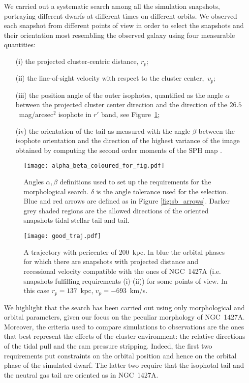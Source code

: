 We carried out a systematic search among all the simulation snapshots, portraying different dwarfs at different times on different orbits.
We observed each snapshot from different points of view in order to select the snapshots and their orientation most resembling the observed galaxy using four measurable quantities:
\begin{enumerate}
    \item[(i)] the projected cluster-centric distance, $r_p$;
    \item[(ii)] the line-of-sight velocity with respect to the cluster center,~$v_p$;
    \item[(iii)] the position angle of the outer isophotes, quantified as the angle $\alpha$ between the projected cluster center direction and the direction of the $26.5$~mag/arcsec$^2$ isophote in $r'$ band, see Figure~\ref{fig:angles_scheme};
    \item[(iv)] the orientation of the \Hi{} tail as measured with the angle $\beta$ between the isophote orientation and the direction of the highest variance of the image obtained by computing the second order moments of the \Hi{} SPH map \citep{Stobie1980}.
\end{enumerate}
\begin{figure}
\centering
\texttt{[image: alpha\_beta\_coloured\_for\_fig.pdf]}
\caption{Angles $\alpha, \beta$ definitions used to set up the  requirements for the morphological search. $\delta$ is the angle tolerance used for the selection. Blue and red arrows are defined as in Figure \ref{fig:sb_arrows}. Darker grey shaded regions are the allowed directions of the oriented snapshots tidal stellar tail and \Hi{} tail.}
\label{fig:angles_scheme}
\end{figure}
\begin{figure}
\centering
\texttt{[image: good\_traj.pdf]}
\caption{A trajectory with pericenter of 200~kpc. In blue the orbital phases for which there are snapshots with projected distance and recessional velocity compatible with the ones of NGC~1427A (i.e. snapshots fulfilling requirements (i)-(ii)) for some points of view.
In this case $r_p = 137$~kpc, $v_p = -693$~km/s.}
\label{fig:good_traj}
\end{figure}
We highlight that the search has been carried out using only morphological and orbital parameters, given our focus on the peculiar morphology of NGC~1427A.
Moreover, the criteria used to compare simulations to observations are the ones that best represent the effects of the cluster environment: the relative directions of the tidal pull and the ram pressure stripping. Indeed, the first two requirements put constraints on the orbital position and hence on the orbital phase of the simulated dwarf. The latter two require that the isophotal tail and the neutral gas tail are oriented as in NGC~1427A.
